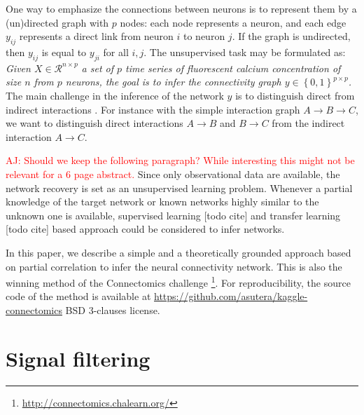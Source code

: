 \documentclass[wcp]{jmlr}
\begin{document}
One way to emphasize the connections between neurons is to represent them by a
(un)directed graph with $p$ nodes: each node represents a neuron, and each
edge $y_{ij}$ represents a direct link from neuron  $i$ to neuron $j$. If the
graph is undirected, then $y_{ij}$ is equal to $y_{ji}$  for all $i,j$.
The unsupervised task may be formulated as:
\textit{Given $X \in \mathcal{R}^{n \times p}$  a set of $p$ time series of
fluorescent calcium concentration of size $n$ from $p$ neurons, the goal is to
infer the connectivity graph $y \in \left\{0, 1\right\}^{p \times p}$.}
The main challenge in the inference of the network $y$
is to distinguish direct from indirect interactions \cite{de2004discovery}.
For instance with the simple interaction graph $A \rightarrow B \rightarrow C$,
we want to distinguish direct interactions $A \rightarrow B$ and $B \rightarrow C$
from the indirect interaction $A \rightarrow C$.

\textcolor{red}{AJ: Should we keep the following paragraph? While interesting
                this might not be relevant for a 6 page abstract.}
Since only observational data are available, the network recovery is set as an
unsupervised learning problem. Whenever a partial knowledge of the target
network or known networks highly similar to the unknown one is available,
supervised learning [todo cite] and transfer learning  [todo cite] based
approach could be considered to infer networks.

In this paper, we describe a simple and a theoretically grounded approach
based on partial correlation to infer the neural connectivity network.
This is also the winning method of the Connectomics challenge
\footnote{\url{http://connectomics.chalearn.org/}}. For reproducibility, the
source code of the method is available at
\url{https://github.com/asutera/kaggle-connectomics}  BSD 3-clauses
license.

\section{Signal filtering} \label{sec:filter}

\end{document}
